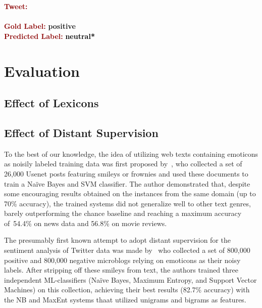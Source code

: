 \begin{example}\label{snt:cgsa:exmp:lba-error}
  \noindent\textup{\bfseries\textcolor{darkred}{Tweet:}} {\upshape }\\
  \noindent \\[\exampleSep]
  \noindent\textup{\bfseries\textcolor{darkred}{Gold Label:}}\hspace*{4.3em}\textbf{%
    \upshape\textcolor{green3}{positive}}\\
 \noindent\textup{\bfseries\textcolor{darkred}{Predicted Label:}}\hspace*{2em}\textbf{%
    \upshape\textcolor{black}{neutral*}}
\end{example}

\section{Evaluation}
\subsection{Effect of Lexicons}\label{cgsa:subsec:eval:lexicons}


\subsection{Effect of Distant Supervision}
\todo[inline]{}

To the best of our knowledge, the idea of utilizing web texts
containing emoticons as noisily labeled training data was first
proposed by~\citet{Read:05}, who collected a set of 26,000 Usenet
posts featuring smileys or frownies and used these documents to train
a Na{\"i}ve Bayes and SVM classifier.  The author demonstrated that,
despite some encouraging results obtained on the instances from the
same domain (up to 70\% accuracy), the trained systems did not
generalize well to other text genres, barely outperforming the chance
baseline and reaching a maximum accuracy of~54.4\% on news data and
56.8\% on movie reviews.

The presumably first known attempt to adopt distant supervision for
the sentiment analysis of Twitter data was made by~\citet{Go:09} who
collected a set of 800,000 positive and 800,000 negative microblogs
relying on emoticons as their noisy labels.  After stripping off these
smileys from text, the authors trained three independent
ML-classifiers (Na{\"i}ve Bayes, Maximum Entropy, and Support Vector
Machines) on this collection, achieving their best results (82.7\%
accuracy) with the NB and MaxEnt systems thaat utilized unigrams and
bigrams as features.

